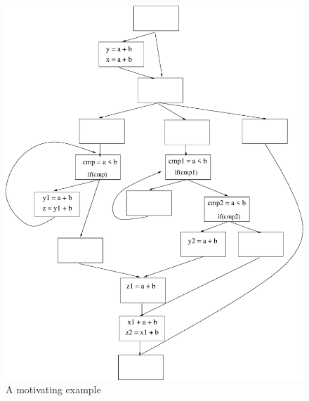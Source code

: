 \documentclass[10pt,twoside]{report}
\begin{document}
\begin{figure}[htbp]
  \begin{center}
     \includegraphics[scale=0.4]{1} 
  \end{center}
  \caption{A motivating example}
    \label{fig:1} 
\end{figure}
\end{document}
